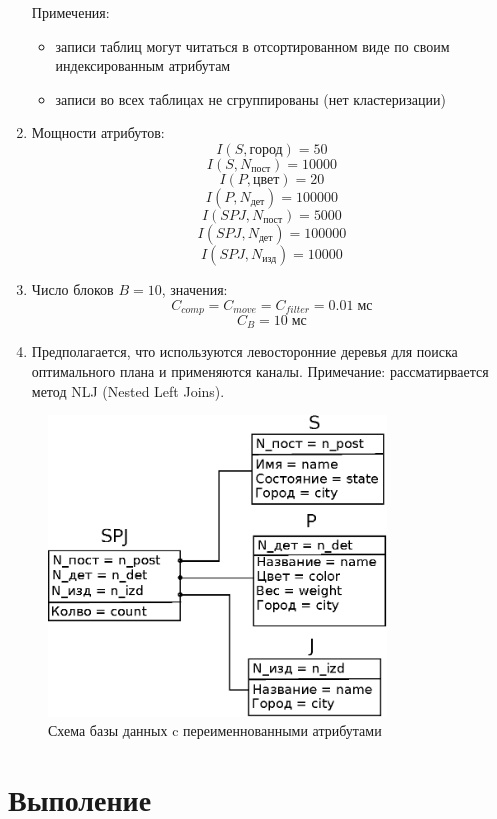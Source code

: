\documentclass[russian,utf8,emptystyle]{eskdtext}
\begin{document}
\begin{enumerate}[label=\arabic*.]
Примечения:
\begin{itemize}
\item записи таблиц могут читаться в отсортированном виде по своим индексированным атрибутам
\item записи во всех таблицах не сгруппированы (нет кластеризации)
\end{itemize}

\item Мощности атрибутов:
$$
I(S,\text{город}) = 50
$$
$$
I(S,N_\text{пост}) = 10000
$$
$$
I(P,\text{цвет}) = 20
$$
$$
I(P,N_\text{дет}) = 100000
$$
$$
I(SPJ,N_\text{пост}) = 5000
$$
$$
I(SPJ,N_\text{дет}) = 100000
$$
$$
I(SPJ,N_\text{изд}) = 10000
$$

\item Число блоков $B = 10$, значения:
$$
C_{comp} = C_{move} = C_{filter} = 0.01 \; \text{мс}
$$
$$
C_B = 10 \; \text{мс}
$$

\item Предполагается, что используются левосторонние деревья для поиска оптимального плана и применяются каналы. Примечание: рассматирвается метод NLJ (Nested Left Joins).
\end{enumerate}

\begin{figure}[h!]
\centering
\includegraphics[width=0.8\textwidth]{sheme}
\caption{Схема базы данных c переименнованными атрибутами}
\label{fig:sheme}
\end{figure}

\section{Выполение}
\end{document}

